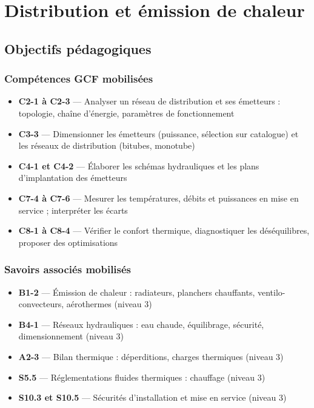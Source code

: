 \chapter{Distribution et émission de chaleur}

\section{Objectifs pédagogiques}

\subsection*{Compétences GCF mobilisées}
\begin{itemize}
  \item \textbf{C2-1 à C2-3} — Analyser un réseau de distribution et ses émetteurs : topologie, chaîne d'énergie, paramètres de fonctionnement
  \item \textbf{C3-3} — Dimensionner les émetteurs (puissance, sélection sur catalogue) et les réseaux de distribution (bitubes, monotube)
  \item \textbf{C4-1 et C4-2} — Élaborer les schémas hydrauliques et les plans d'implantation des émetteurs
  \item \textbf{C7-4 à C7-6} — Mesurer les températures, débits et puissances en mise en service ; interpréter les écarts
  \item \textbf{C8-1 à C8-4} — Vérifier le confort thermique, diagnostiquer les déséquilibres, proposer des optimisations
\end{itemize}

\subsection*{Savoirs associés mobilisés}
\begin{itemize}
  \item \textbf{B1-2} — Émission de chaleur : radiateurs, planchers chauffants, ventilo-convecteurs, aérothermes (niveau 3)
  \item \textbf{B4-1} — Réseaux hydrauliques : eau chaude, équilibrage, sécurité, dimensionnement (niveau 3)
  \item \textbf{A2-3} — Bilan thermique : déperditions, charges thermiques (niveau 3)
  \item \textbf{S5.5} — Réglementations fluides thermiques : chauffage (niveau 3)
  \item \textbf{S10.3 et S10.5} — Sécurités d'installation et mise en service (niveau 3)
\end{itemize}

